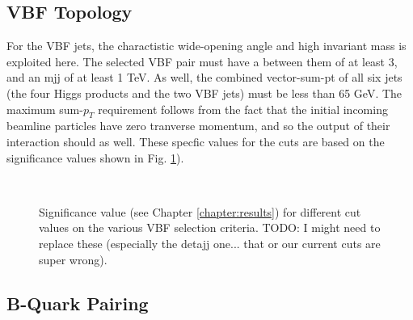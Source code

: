     \subsection{VBF Topology}

        For the VBF jets, the charactistic wide-opening angle and high invariant mass is exploited here.
        The selected VBF pair must have a \deta between them of at least 3,
            and an mjj of at least 1 TeV.
        As well, the combined vector-sum-pt of all six jets
            (the four Higgs products and the two VBF jets)
            must be less than 65 GeV.
        The maximum sum-$p_T$ requirement follows from the fact that the initial incoming beamline particles have
            zero tranverse momentum, and so the output of their interaction should as well.
        These specfic values for the cuts are based on the significance values shown in Fig. \ref{fig:vbf_cuts}).

        \begin{figure}[tbh]
            \\
            \caption{
                Significance value (see Chapter \ref{chapter:results})
                    for different cut values on the various VBF selection criteria\cite{vbf_hh_4b_2018_int}.
                TODO: I might need to replace these (especially the detajj one... that or our current cuts are super wrong).
            }
            \label{fig:vbf_cuts}
        \end{figure}
        \FloatBarrier


    \subsection{B-Quark Pairing}

